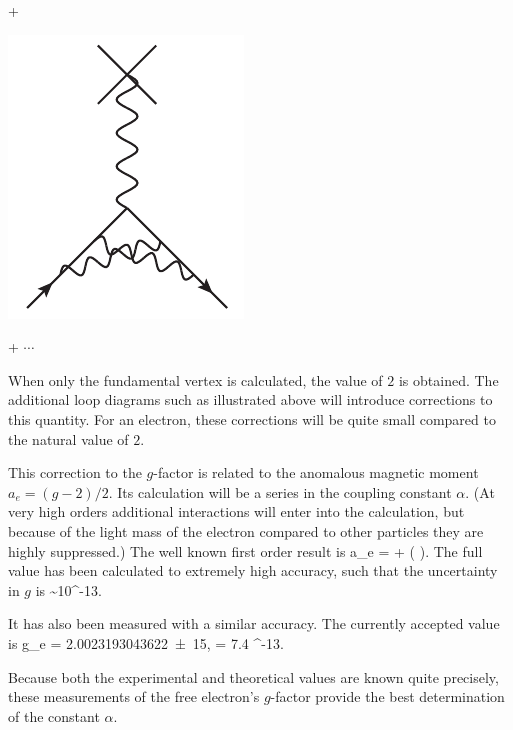 {\begin{minipage}{1in}
\end{minipage}
+
\begin{minipage}{1in}
   \begin{center} \includegraphics[scale=0.5]{eps/QEDloop2} \end{center} 
\end{minipage}
+ \hspace{2em} $\cdots$
 }
\vspace{1em} 
 
When only the fundamental vertex is calculated, the value of $2$ is obtained.  The additional loop diagrams such as illustrated above will introduce corrections to this quantity.  For an electron, these corrections will be quite small compared to the natural value of $2$. 
 
 
 
This correction to the $g$-factor is related to the anomalous magnetic moment $a_e = (g-2)/2$.  Its calculation will be a series in the coupling constant $\alpha$.   (At very high orders additional interactions will enter into the calculation, but because of the light mass of the electron compared to other particles they are highly suppressed.)  The well known \cite{book:PS1995} first order result is
 \beq
 	a_e = \frac{\alpha}{2\pi} + ( ).
 \eeq
The full value has been calculated to extremely high accuracy, such that the uncertainty in $g$ is 
\beq
	 \sim 10^{-13}.
\eeq

It has also been measured with a similar accuracy.  The currently accepted value \cite{Gabrielse:2006gg} is 
\beq
	g_e = \num{2.002 319 304 3622(15)},    \hspace{2em} \delta = 7.4 ^{-13}.
\eeq

Because both the experimental and theoretical values are known quite precisely, these measurements of the free electron's $g$-factor provide the best determination of the constant $\alpha$.  

